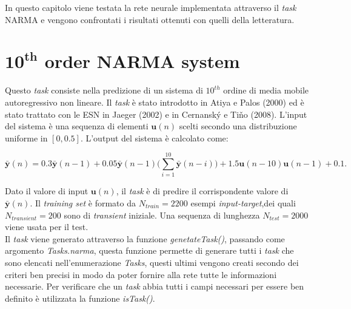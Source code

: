 In questo capitolo viene testata la rete neurale implementata attraverso il \textit{task} NARMA e vengono confrontati i risultati ottenuti con quelli della letteratura.

\section{$\mathbf{10^{th}}$ order NARMA system}
Questo \textit{task} consiste nella predizione di un sistema di $10^{th}$ ordine di media mobile autoregressivo non lineare. Il \textit{task} è stato introdotto in Atiya e Palos (2000) ed è stato trattato con le ESN in Jaeger (2002) e in Cernansk\'y e Ti\v{n}o (2008). L'input del sistema è una sequenza di elementi $\mathbf{u}(n)$ scelti secondo una distribuzione uniforme in $[0,0.5]$. L'output del sistema è calcolato come:

\begin{equation}\label{narma}
	\bar{\mathbf{y}}(n) = 0.3\bar{\mathbf{y}}(n-1) + 0.05\bar{\mathbf{y}}(n-1)\biggl( \sum_{i=1}^{10}\bar{\mathbf{y}}(n - i)\biggr) + 1.5 \mathbf{u}(n-10)\mathbf{u}(n-1) +0.1 .
\end{equation}

Dato il valore di input $\mathbf{u}(n)$, il \textit{task} è di predire il corrispondente valore di $\bar{\mathbf{y}}(n)$. Il \textit{training set} è formato da $N_{train}=2200$ esempi \textit{input-target},dei quali $N_{transient}=200$ sono di \textit{transient} iniziale. Una sequenza di lunghezza $N_{test}=2000$ viene usata per il test.\\
Il \textit{task} viene generato attraverso la funzione \textit{genetateTask()}, passando come argomento \textit{Tasks.narma}, questa funzione permette di generare tutti i \textit{task} che sono elencati nell'enumerazione \textit{Tasks}, questi ultimi vengono creati secondo dei criteri ben precisi in modo da poter fornire alla rete tutte le informazioni necessarie. Per verificare che un \textit{task} abbia tutti i campi necessari per essere ben definito è utilizzata la funzione \textit{isTask()}.

